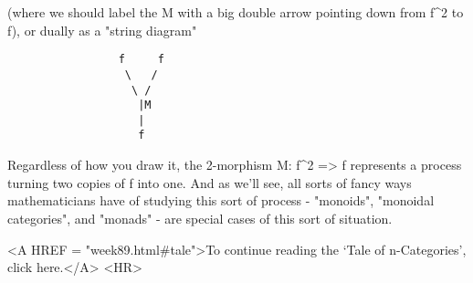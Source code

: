 (where we should label the M with a big double arrow pointing down from
f^{2} to f), or dually as a "string diagram"
       
\begin{verbatim}
                 f     f
                  \   /
                   \ /
                    |M
                    |
                    f

\end{verbatim}
    
Regardless of how you draw it, the 2-morphism M: f^{2} => f represents
a process turning two copies of f into one.  And as we'll see, all
sorts of fancy ways mathematicians have of studying this sort of
process - "monoids", "monoidal categories", and "monads" - are
special cases of this sort of situation.   

<A HREF = "week89.html#tale">To continue reading the `Tale of
n-Categories', click here.</A>
<HR>



